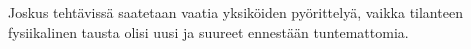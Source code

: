 
%
%
%
%	

Joskus tehtävissä saatetaan vaatia yksiköiden pyörittelyä, vaikka tilanteen fysiikalinen tausta olisi uusi ja suureet ennestään tuntemattomia.
%


